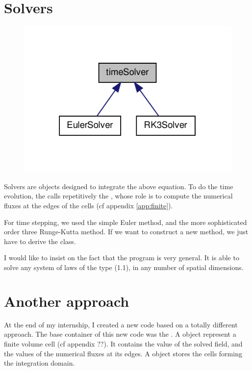 \section{Solvers}

\begin{figure}[htp]
\centering
\includegraphics[scale=1.00]{appendix/classtime_solver__inherit__graph.pdf}
\caption{}
\label{}
\end{figure}

Solvers are objects designed to integrate the above equation. 
To do the time evolution, the  calls repetitively the , whose role is to compute the numerical fluxes at the edges of the cells (cf appendix \ref{app:finite}).

For time stepping, we used the simple Euler method, and the more sophisticated order three Runge-Kutta method. 
If we want to construct a new method, we just have to derive the  class.

I would like to insist on the fact that the program is very general. It is able to solve any system of laws of the type (1.1), in any number of spatial dimensions.

\section{Another approach}
At the end of my internship, I created a new code based on a totally different approach. 
The base container of this new code was the . A  object represent a finite volume cell (cf appendix ??). It contains the value of the solved field, and the values of the numerical fluxes at its edges.
A  object stores the cells forming the integration domain. 

